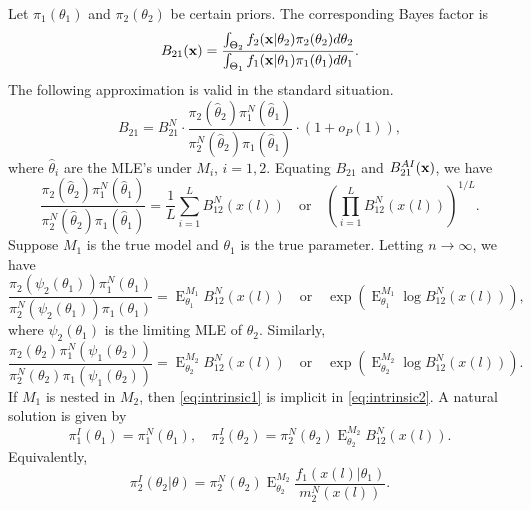 \documentclass[11pt]{article}
\DeclareMathOperator{\myE}{E}
\theoremstyle{plain}
\theoremstyle{definition}
\theoremstyle{remark}
\begin{document}
Let $\pi_1(\theta_1)$ and $\pi_2(\theta_2)$ be certain priors.
The corresponding Bayes factor is
\begin{equation*}
    B_{21}(\mathbf{x}) = \frac{
        \int_{\Theta_2} f_2 (\mathbf{x} |\theta_2) \pi_2 (\theta_2) d \theta_2
    }{
        \int_{\Theta_1} f_1 (\mathbf{x} |\theta_1) \pi_1 (\theta_1) d \theta_1
    }.
\end{equation*}
The following approximation is valid in the standard situation.
\begin{equation*}
    B_{21}= B_{21}^N \cdot  \frac{\pi_2 (\hat \theta_2)\pi_1^N (\hat \theta_1)}{\pi_2^N (\hat \theta_2)\pi_1 (\hat \theta_1)}  \cdot (1+o_P(1)),
\end{equation*}
where $\hat \theta_i$ are the MLE's under $M_i$, $i=1,2$.
Equating $B_{21}$ and $B_{21}^{AI} (\mathbf{x})$, we have
\begin{equation*}
    \frac{\pi_2 (\hat \theta_2)\pi_1^N (\hat \theta_1)}{\pi_2^N (\hat \theta_2)\pi_1 (\hat \theta_1)}
    =\frac 1 L \sum_{i=1}^L B_{12}^N (x(l))
    \quad \text{or} \quad
    \left( \prod_{i=1}^L B_{12}^N (x(l)) \right)^{1/L}.
\end{equation*}
Suppose $M_1$ is the true model and $\theta_1$ is the true parameter.
Letting $n\to \infty$, we have
\begin{equation}\label{eq:intrinsic1}
    \frac{\pi_2 (\psi_2(\theta_1))\pi_1^N (\theta_1)}{\pi_2^N (\psi_2(\theta_1))\pi_1 ( \theta_1)}
    =\myE_{\theta_1}^{M_1} B_{12}^N (x(l))
    \quad \text{or} \quad
    \exp\left(
        \myE_{\theta_1}^{M_1} \log B_{12}^N (x(l)) 
    \right),
\end{equation}
where $\psi_2(\theta_1)$ is the limiting MLE of $\theta_2$.
Similarly,
\begin{equation}\label{eq:intrinsic2}
    \frac{\pi_2 (\theta_2)\pi_1^N (\psi_1(\theta_2))}{\pi_2^N (\theta_2)\pi_1 ( \psi_1(\theta_2))}
    =\myE_{\theta_2}^{M_2} B_{12}^N (x(l))
    \quad \text{or} \quad
    \exp\left(
        \myE_{\theta_2}^{M_2} \log B_{12}^N (x(l)) 
    \right).
\end{equation}
If $M_1$ is nested in $M_2$, then \eqref{eq:intrinsic1} is implicit in \eqref{eq:intrinsic2}.
A natural solution is given by
\begin{equation*}
    \pi_1^I(\theta_1)=  \pi_1^N (\theta_1),
    \quad
    \pi_2^I(\theta_2)=  \pi_2^N (\theta_2)\myE_{\theta_2}^{M_2} B_{12}^N (x(l)).
\end{equation*}
Equivalently,
\begin{equation*}
    \pi_2^I(\theta_2|\theta)=  \pi_2^N (\theta_2)\myE_{\theta_2}^{M_2} \frac{
        f_1(x(l)|\theta_1)
    }{m_2^N (x(l))}.
\end{equation*}
\end{document}

